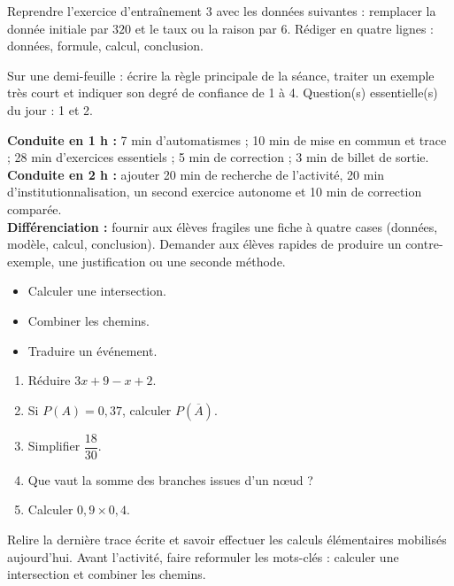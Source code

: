     \begin{dm}Reprendre l'exercice d'entraînement 3 avec les données suivantes : remplacer la donnée initiale par $320$ et le taux ou la raison par $6$. Rédiger en quatre lignes : données, formule, calcul, conclusion.\end{dm}

    \begin{sortie}Sur une demi-feuille : écrire la règle principale de la séance, traiter un exemple très court et indiquer son degré de confiance de 1 à 4. Question(s) essentielle(s) du jour : 1 et 2.\end{sortie}

    \ifprof
    \begin{methode}
    \textbf{Conduite en 1 h :} 7 min d'automatismes ; 10 min de mise en commun et trace ; 28 min d'exercices essentiels ; 5 min de correction ; 3 min de billet de sortie.\\
    \textbf{Conduite en 2 h :} ajouter 20 min de recherche de l'activité, 20 min d'institutionnalisation, un second exercice autonome et 10 min de correction comparée.\\
    \textbf{Différenciation :} fournir aux élèves fragiles une fiche à quatre cases (données, modèle, calcul, conclusion). Demander aux élèves rapides de produire un contre-exemple, une justification ou une seconde méthode.
    \end{methode}
    \fi
{}
    \begin{objectifs}\begin{itemize}\item Calculer une intersection.\item Combiner les chemins.\item Traduire un événement.\end{itemize}\end{objectifs}
    \begin{automatismes}\begin{enumerate}\item Réduire $3x+9-x+2$. \item Si $P(A)=0{,}37$, calculer $P(\overline A)$. \item Simplifier $\dfrac{18}{30}$. \item Que vaut la somme des branches issues d'un nœud ? \item Calculer $0{,}9\times0{,}4$. \end{enumerate}\end{automatismes}
    \begin{prerequis}Relire la dernière trace écrite et savoir effectuer les calculs élémentaires mobilisés aujourd'hui. Avant l'activité, faire reformuler les mots-clés : calculer une intersection et combiner les chemins.\end{prerequis}

